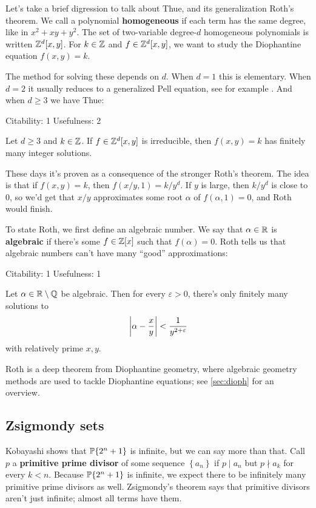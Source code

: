 \documentclass[11pt,paper=letter]{scrartcl}
\newcommand{\seq}[1]{\left\{#1\right\}}
\newcommand{\primeseq}[1]{\PP\!\seq{#1}}
\newcommand{\thmrating}[3]{\begin{center}\sffamily%
\bluebf{#1.} \hfill Citability: #2 \qquad Usefulness: #3%
\vspace{0.3em}\end{center}\noindent\!\!}
\begin{document}
Let's take a brief digression to talk about Thue, and its generalization Roth's theorem. We call a polynomial \textbf{homogeneous} if each term has the same degree, like in $x^2 + xy + y^2$. The set of two-variable degree-$d$ homogeneous polynomials is written $\mathbb Z^d[x, y]$. For $k \in \mathbb Z$ and $f \in \mathbb Z^d[x, y]$, we want to study the Diophantine equation $f(x, y) = k$.

The method for solving these depends on $d$. When $d = 1$ this is elementary. When $d = 2$ it usually reduces to a generalized Pell equation, see for example \cite{djukic07}. And when $d \ge 3$ we have Thue:

\begin{thmboxed*}
\thmrating{Thue's theorem}{1}{2}
Let $d \ge 3$ and $k \in \mathbb Z$. If $f \in \mathbb Z^d[x, y]$ is irreducible, then $f(x, y) = k$ has finitely many integer solutions.
\end{thmboxed*}

These days it's proven as a consequence of the stronger Roth's theorem. The idea is that if $f(x, y) = k$, then $f(x/y, 1) = k/y^d$. If $y$ is large, then $k/y^d$ is close to $0$, so we'd get that $x/y$ approximates some root $\alpha$ of $f(\alpha, 1) = 0$, and Roth would finish.

To state Roth, we first define an algebraic number. We say that $\alpha \in \mathbb R$ is \textbf{algebraic} if there's some $f \in \mathbb Z[x]$ such that $f(\alpha) = 0$. Roth tells us that algebraic numbers can't have many ``good'' approximations:

\begin{thmboxed*}
\thmrating{Roth's theorem}{1}{1}
Let $\alpha \in \mathbb R \setminus \mathbb Q$ be algebraic. Then for every $ \varepsilon > 0$, there's only finitely many solutions to $$ \left\lvert \alpha - \frac{x}{y} \right\rvert < \frac{1}{y^{2 + \varepsilon}} $$ with relatively prime $x, y$.
\end{thmboxed*}

Roth is a deep theorem from Diophantine geometry, where algebraic geometry methods are used to tackle Diophantine equations; see \autoref{sec:dioph} for an overview.

\subsection{Zsigmondy sets}

Kobayashi shows that $\primeseq{2^n + 1}$ is infinite, but we can say more than that. Call $p$ a \textbf{primitive prime divisor} of some sequence $\seq{a_n}$ if $p \mid a_n$ but $p \nmid a_k$ for every $k < n$. Because $\primeseq{2^n + 1}$ is infinite, we expect there to be infinitely many primitive prime divisors as well. Zsigmondy's theorem says that primitive divisors aren't just infinite; almost all terms have them.
\end{document}
